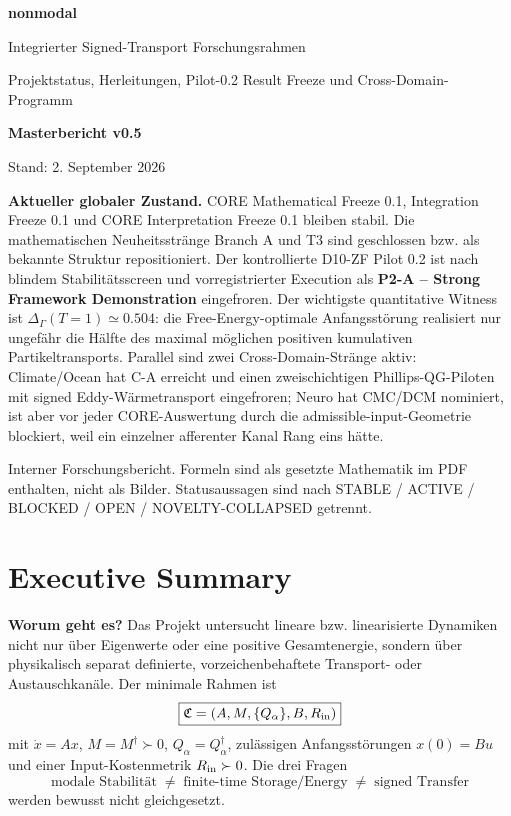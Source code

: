 \begin{titlepage}
\centering
\vspace*{1.8cm}
{\Huge\bfseries nonmodal\par}
\vspace{0.5cm}
{\LARGE Integrierter Signed-Transport Forschungsrahmen\par}
\vspace{0.3cm}
{\Large Projektstatus, Herleitungen, Pilot-0.2 Result Freeze und Cross-Domain-Programm\par}
\vspace{1.1cm}
{\Huge\bfseries Masterbericht v0.5\par}
\vspace{0.5cm}
{\large Stand: 2. September 2026\par}
\vfill
\begin{minipage}{0.88\textwidth}
\textbf{Aktueller globaler Zustand.} CORE Mathematical Freeze 0.1, Integration Freeze 0.1 und CORE Interpretation Freeze 0.1 bleiben stabil. Die mathematischen Neuheitsstränge Branch A und T3 sind geschlossen bzw. als bekannte Struktur repositioniert. Der kontrollierte D10-ZF Pilot 0.2 ist nach blindem Stabilitätsscreen und vorregistrierter Execution als \textbf{P2-A -- Strong Framework Demonstration} eingefroren. Der wichtigste quantitative Witness ist $\Delta_\Gamma(T=1)\simeq0.504$: die Free-Energy-optimale Anfangsstörung realisiert nur ungefähr die Hälfte des maximal möglichen positiven kumulativen Partikeltransports. Parallel sind zwei Cross-Domain-Stränge aktiv: Climate/Ocean hat C-A erreicht und einen zweischichtigen Phillips-QG-Piloten mit signed Eddy-Wärmetransport eingefroren; Neuro hat CMC/DCM nominiert, ist aber vor jeder CORE-Auswertung durch die admissible-input-Geometrie blockiert, weil ein einzelner afferenter Kanal Rang eins hätte.
\end{minipage}
\vfill
{\small Interner Forschungsbericht. Formeln sind als gesetzte Mathematik im PDF enthalten, nicht als Bilder. Statusaussagen sind nach STABLE / ACTIVE / BLOCKED / OPEN / NOVELTY-COLLAPSED getrennt.}
\end{titlepage}

\section*{Executive Summary}
\textbf{Worum geht es?} Das Projekt untersucht lineare bzw. linearisierte Dynamiken nicht nur über Eigenwerte oder eine positive Gesamtenergie, sondern über physikalisch separat definierte, vorzeichenbehaftete Transport- oder Austauschkanäle. Der minimale Rahmen ist
\[
\boxed{\mathfrak C=(A,M,\{Q_\alpha\},B,R_{\rm in})}
\]
mit $\dot x=Ax$, $M=M^\dagger\succ0$, $Q_\alpha=Q_\alpha^\dagger$, zulässigen Anfangsstörungen $x(0)=Bu$ und einer Input-Kostenmetrik $R_{\rm in}\succ0$. Die drei Fragen
\[
\boxed{\text{modale Stabilität}\;\neq\;\text{finite-time Storage/Energy}\;\neq\;\text{signed Transfer}}
\]
werden bewusst nicht gleichgesetzt.

